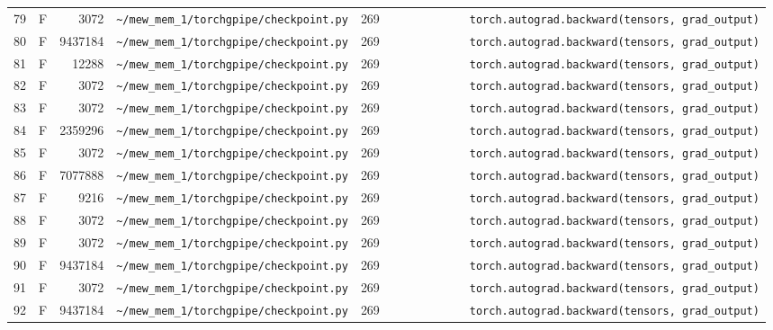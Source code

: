 \documentclass{article}
\begin{document}
\begin{longtable}{r l r p{6.5cm} r p{7.0cm}}
79 & F & 3072 & \lstinline|~/mew_mem_1/torchgpipe/checkpoint.py| & 269 & \lstinline|            torch.autograd.backward(tensors, grad_output)| \\
80 & F & 9437184 & \lstinline|~/mew_mem_1/torchgpipe/checkpoint.py| & 269 & \lstinline|            torch.autograd.backward(tensors, grad_output)| \\
81 & F & 12288 & \lstinline|~/mew_mem_1/torchgpipe/checkpoint.py| & 269 & \lstinline|            torch.autograd.backward(tensors, grad_output)| \\
82 & F & 3072 & \lstinline|~/mew_mem_1/torchgpipe/checkpoint.py| & 269 & \lstinline|            torch.autograd.backward(tensors, grad_output)| \\
83 & F & 3072 & \lstinline|~/mew_mem_1/torchgpipe/checkpoint.py| & 269 & \lstinline|            torch.autograd.backward(tensors, grad_output)| \\
84 & F & 2359296 & \lstinline|~/mew_mem_1/torchgpipe/checkpoint.py| & 269 & \lstinline|            torch.autograd.backward(tensors, grad_output)| \\
85 & F & 3072 & \lstinline|~/mew_mem_1/torchgpipe/checkpoint.py| & 269 & \lstinline|            torch.autograd.backward(tensors, grad_output)| \\
86 & F & 7077888 & \lstinline|~/mew_mem_1/torchgpipe/checkpoint.py| & 269 & \lstinline|            torch.autograd.backward(tensors, grad_output)| \\
87 & F & 9216 & \lstinline|~/mew_mem_1/torchgpipe/checkpoint.py| & 269 & \lstinline|            torch.autograd.backward(tensors, grad_output)| \\
88 & F & 3072 & \lstinline|~/mew_mem_1/torchgpipe/checkpoint.py| & 269 & \lstinline|            torch.autograd.backward(tensors, grad_output)| \\
89 & F & 3072 & \lstinline|~/mew_mem_1/torchgpipe/checkpoint.py| & 269 & \lstinline|            torch.autograd.backward(tensors, grad_output)| \\
90 & F & 9437184 & \lstinline|~/mew_mem_1/torchgpipe/checkpoint.py| & 269 & \lstinline|            torch.autograd.backward(tensors, grad_output)| \\
91 & F & 3072 & \lstinline|~/mew_mem_1/torchgpipe/checkpoint.py| & 269 & \lstinline|            torch.autograd.backward(tensors, grad_output)| \\
92 & F & 9437184 & \lstinline|~/mew_mem_1/torchgpipe/checkpoint.py| & 269 & \lstinline|            torch.autograd.backward(tensors, grad_output)| \\

\end{longtable}
\end{document}
